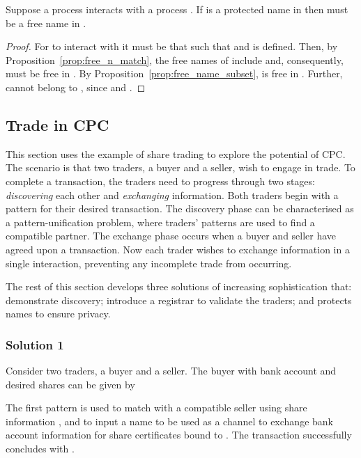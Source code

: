 \documentclass{LMCS}
\begin{document}
\begin{prop}
\label{prop:free_n_match_proc}
Suppose a process  interacts with a process . If  is a protected
name in  then  must be a free name in .
\end{prop}
\begin{proof}
  For  to interact with  it must be that  such that  and  is defined. Then, by
  Proposition~\ref{prop:free_n_match}, the free names of  include
   and, consequently,  must be free in .  By
  Proposition~\ref{prop:free_name_subset},  is free in . Further,
   cannot belong to , since  and
  .
\end{proof}


\subsection{Trade in CPC}
\label{subsec:cpc-trade}

This section uses the example of share trading to explore the
potential of CPC. The scenario is that two  traders, a buyer
and a seller, wish to engage in trade. To complete a transaction, the
traders need to progress through two stages: {\em discovering} each
other and {\em exchanging} information. Both traders begin with a
pattern for their desired transaction.
The discovery phase can be characterised as a pattern-unification
problem, where traders' patterns are used to find a compatible
partner.
The exchange phase occurs when a buyer and seller have agreed upon a
transaction. Now each trader wishes to exchange information in a
single interaction, preventing any incomplete trade from occurring.

The rest of this section develops three solutions of increasing
sophistication that: demonstrate discovery; introduce a registrar to
validate the traders; and protects names to ensure privacy.
\enlargethispage{\baselineskip}

\subsubsection*{Solution 1}
\label{sec:example:sol1}
Consider two traders, a buyer and a seller. The buyer  with
bank account  and desired shares  can be given by

The first pattern  is used to match with a
compatible seller using share information , and to input a name 
to be used as a channel to exchange bank account information  for
share certificates bound to . The transaction successfully
concludes with .
\end{document}
